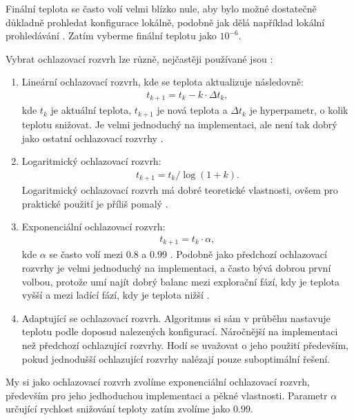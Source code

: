 Finální teplota se často volí velmi blízko nule, aby bylo možné dostatečně důkladně prohledat konfigurace lokálně, podobně jak dělá například lokální prohledávání \cite{sa_theory}.
Zatím vyberme finální teplotu jako $10^{-6}$.

Vybrat ochlazovací rozvrh lze různě, nejčastěji používané jsou \cite{sa_theory}:
\begin{enumerate}
  \item Lineární ochlazovací rozvrh, kde se teplota aktualizuje následovně:
    \begin{align*}
      t_{k+1} = t_k - k \cdot \Delta t_k,
    \end{align*}
    kde $t_k$ je aktuální teplota, $t_{k+1}$ je nová teplota a $\Delta t_k$ je hyperpametr, o kolik teplotu snižovat.
    Je velmi jednoduchý na implementaci, ale není tak dobrý jako ostatní ochlazovací rozvrhy \cite{sa_schedules}.

  \item Logaritmický ochlazovací rozvrh:
    \begin{align*}
      t_{k+1} = t_{k} / \log(1 + k).
    \end{align*}
    Logaritmický ochlazovací rozvrh má dobré teoretické vlastnosti, ovšem pro praktické použití je příliš pomalý \cite{sa_schedules}.

  \item Exponenciální ochlazovací rozvrh:
    \begin{align*}
      t_{k+1} = t_k \cdot \alpha,
    \end{align*}
    kde $\alpha$ se často volí mezi 0.8 a 0.99 \cite{sa_theory}.
    Podobně jako předchozí ochlazovací rozvrhy je velmi jednoduchý na implementaci, a často bývá dobrou první volbou, protože umí najít dobrý balanc mezi explorační fází,
    kdy je teplota vyšší a mezi ladící fází, kdy je teplota nižší \cite{sa_theory}.

  \item Adaptující se ochlazovací rozvrh. Algoritmus si sám v průběhu nastavuje teplotu podle doposud nalezených konfigurací.
    Náročnější na implementaci než předchozí ochlazující rozvrhy. Hodí se uvažovat o jeho použití především, pokud jednodušší ochlazující rozvrhy nalézají pouze suboptimální řešení.
\end{enumerate}

My si jako ochlazovací rozvrh zvolíme exponenciální ochlazovací rozvrh, především pro jeho jedhoduchou implementaci a pěkné vlastnosti.
Parametr $\alpha$ určující rychlost snižování teploty zatím zvolíme jako $0.99$.

